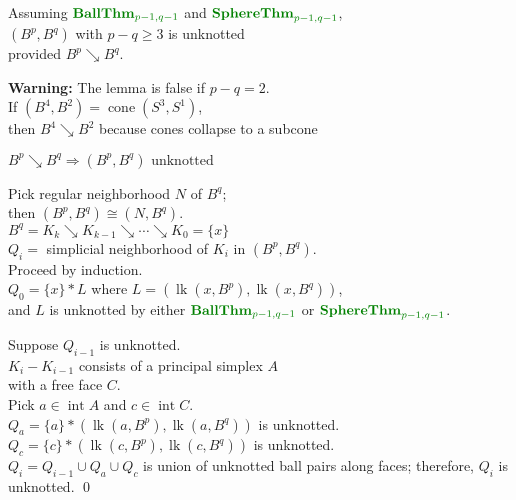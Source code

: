 \documentclass[14pt]{beamer}
\newcommand{\collapses}{\searrow}
\newcommand{\join}{\ast}
\newcommand{\BallThm}[1]{\mbox{$\textcolor{green!50!black}{\mbox{\textbf{BallThm}}_{#1}}$}}
\newcommand{\SphereThm}[1]{\mbox{$\textcolor{green!50!black}{\mbox{\textbf{SphereThm}}_{#1}}$}}
\DeclareMathOperator{\lk}{lk}
\DeclareMathOperator{\cone}{cone}
\DeclareMathOperator{\interior}{int}
\begin{document}
\begin{frame}
\begin{lemma}
 Assuming $\BallThm{p-1,q-1}$ and $\SphereThm{p-1,q-1}$, \\
 $(B^p,B^q)$ with $p-q \geq 3$ is unknotted \\
 provided $B^p \collapses B^q$.
\end{lemma}

\vfill
\pause

\textcolor{red!50!black}{\textbf{Warning:}} The lemma is false if $p-q = 2$.\\
If $(B^4,B^2) = \cone (S^3,S^1)$, \\
then $B^4 \collapses B^2$ because cones collapse to a subcone \\

\end{frame}

\begin{frame}
  \begin{lemma}
  $B^p \collapses B^q \Rightarrow (B^p,B^q) \mbox{ unknotted}$ \\    
  \end{lemma}
 \pause
   Pick regular neighborhood $N$ of $B^q$; \\\pause
   then $(B^p,B^q) \cong (N,B^q)$.\\\pause
   $B^q = K_k \collapses K_{k-1} \collapses \cdots \collapses K_0 =
   \{x\}$\\\pause
   $Q_i = $ simplicial neighborhood of $K_i$ in $(B^p,B^q)$. \\\pause
   \vfill
   Proceed by induction.\\\pause
   \vfill
   $Q_0 = \{x\} \join L$ where $L = (\lk(x,B^p),\lk(x,B^q))$, \\\pause
   and $L$ is unknotted by either $\BallThm{p-1,q-1}$ or $\SphereThm{p-1,q-1}$.

\end{frame}

\begin{frame}
  Suppose $Q_{i-1}$ is unknotted. \\\pause
  \vfill
  $K_i - K_{i-1}$ consists of a principal simplex $A$ \\with a free face
  $C$. \\\pause
  Pick $a \in \interior A$ and $c \in \interior C$. \\\pause
  \vfill
  $Q_a = \{a\} \join (\lk(a,B^p),\lk(a,B^q))$ is unknotted. \\\pause
  $Q_c = \{c\} \join (\lk(c,B^p),\lk(c,B^q))$ is unknotted. \\\pause
  \vfill
  $Q_i = Q_{i-1} \cup Q_a \cup Q_c$ is union of unknotted ball pairs
  along faces; therefore, $Q_i$ is unknotted. \pause\hfill\qed
\end{frame}
\end{document}
